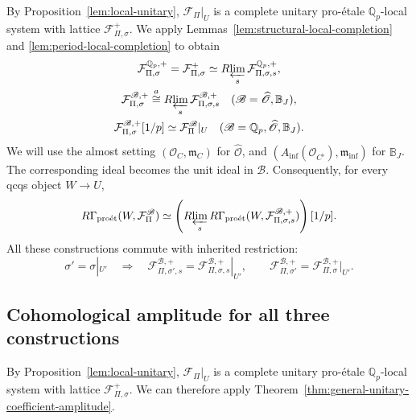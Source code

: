 \documentclass[11pt]{article}
\theoremstyle{definition}
\newcommand{\Qp}{\mathbb Q_p}
\newcommand{\cO}{\mathcal O}
\newcommand{\cF}{\mathcal F}
\newcommand{\proet}{\mathrm{pro\acute et}}
\newcommand{\acong}{\mathrel{\overset{a}{\cong}}}
\begin{document}
By Proposition~\ref{lem:local-unitary}, \(\cF_\Pi|_U\) is a complete
unitary pro-\'etale \(\Qp\)-local system with lattice \(\cF_{\Pi,\sigma}^+\).
We apply Lemmas~\ref{lem:structural-local-completion} and
\ref{lem:period-local-completion} to obtain
\begin{gather*}
 \cF_{\Pi,\sigma}^{\Qp,+}
 =\cF_{\Pi,\sigma}^+
 \simeq R\!\varprojlim_s\cF_{\Pi,\sigma,s}^{\Qp,+},\\
 \cF_{\Pi,\sigma}^{\mathscr B,+}
 \acong R\!\varprojlim_s
       \cF_{\Pi,\sigma,s}^{\mathscr B,+}
 \quad(\mathscr B=\widehat{\mathscr O},\mathbb B_J),\\
 \cF_{\Pi,\sigma}^{\mathscr B,+}[1/p]
 \simeq\cF_\Pi^{\mathscr B}|_U
 \quad(\mathscr B=\Qp,\widehat{\mathscr O},\mathbb B_J).
\end{gather*}
We will use the almost setting \((\cO_C,\mathfrak m_C)\) for
\(\widehat{\mathscr O}\), and
\((A_{\inf}(\cO_{C^\flat}),\mathfrak m_{\inf})\) for
\(\mathbb B_J\).  The corresponding ideal becomes
the unit ideal in \(\mathscr B\).
Consequently, for every qcqs object \(W\to U\),
\begin{equation}\label{eq:local-three-coefficient-completion}
 R\Gamma_{\proet}(W,\cF_\Pi^{\mathscr B})
 \simeq\left(R\!\varprojlim_s R\Gamma_{\proet}
       (W,\cF_{\Pi,\sigma,s}^{\mathscr B,+})\right)[1/p].
\end{equation}
All these constructions commute with inherited restriction:
\[
 \sigma'=\sigma|_{U'}\quad\Longrightarrow\quad
 \cF_{\Pi,\sigma',s}^{\mathscr B,+}
 =\cF_{\Pi,\sigma,s}^{\mathscr B,+}|_{U'},\qquad
 \cF_{\Pi,\sigma'}^{\mathscr B,+}
 =\cF_{\Pi,\sigma}^{\mathscr B,+}|_{U'}.
\]
\subsection{Cohomological amplitude for all three constructions}
\label{subsec:three-coefficient-amplitude}
\label{subsec:arithmetic-amplitude}
\label{subsec:structural-sharp-amplitude}
\label{sec:structural-period-amplitude}
\label{subsec:period-amplitude}
By Proposition~\ref{lem:local-unitary}, \(\cF_\Pi|_U\) is a complete
unitary pro-\'etale \(\Qp\)-local system with lattice \(\cF_{\Pi,\sigma}^+\).
We can therefore apply Theorem~\ref{thm:general-unitary-coefficient-amplitude}.
\end{document}

